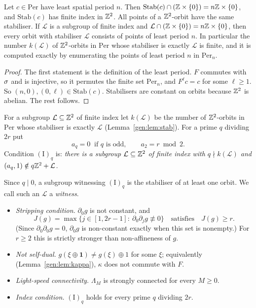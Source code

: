 \begin{lemma}\label{gen:lem:stab}
Let $c\in\mathrm{Per}$ have least spatial period $n$. Then $\mathrm{Stab}(c)\cap(\mathbb{Z}\times\{0\})=n\mathbb{Z}\times\{0\}$, and $\mathrm{Stab}(c)$ has finite index in $\mathbb{Z}^2$. All points of a $\mathbb{Z}^2$-orbit have the same stabiliser. If $\mathcal L$ is a subgroup of finite index and $\mathcal L\cap(\mathbb{Z}\times\{0\})=n\mathbb{Z}\times\{0\}$, then every orbit with stabiliser $\mathcal L$ consists of points of least period $n$. In particular the number $k(\mathcal L)$ of $\mathbb{Z}^2$-orbits in $\mathrm{Per}$ whose stabiliser is exactly $\mathcal L$ is finite, and it is computed exactly by enumerating the points of least period $n$ in $\mathrm{Per}_n$.
\end{lemma}

\begin{proof}
The first statement is the definition of the least period. $F$ commutes with $\sigma$ and is injective, so it permutes the finite set $\mathrm{Per}_n$, and $F^\ell c=c$ for some $\ell\ge1$. So $(n,0),(0,\ell)\in\mathrm{Stab}(c)$. Stabilisers are constant on orbits because $\mathbb{Z}^2$ is abelian. The rest follows.
\end{proof}

\begin{definition}\label{gen:def:index}
For a subgroup $\mathcal L\subseteq\mathbb{Z}^2$ of finite index let $k(\mathcal L)$ be the number of $\mathbb{Z}^2$-orbits in $\mathrm{Per}$ whose stabiliser is exactly $\mathcal L$ (Lemma~\ref{gen:lem:stab}). For a prime $q$ dividing $2r$ put
\[
a_q=0\ \text{ if $q$ is odd},\qquad a_2=r\bmod2 .
\]
Condition $(\mathrm{I})_q$ is: \emph{there is a subgroup $\mathcal L\subseteq\mathbb{Z}^2$ of finite index with $q\nmid k(\mathcal L)$ and $(a_q,1)\notin q\mathbb{Z}^2+\mathcal L$.}
\end{definition}

Since $q\mid0$, a subgroup witnessing $(\mathrm{I})_q$ is the stabiliser of at least one orbit. We call such an $\mathcal L$ a \emph{witness}.

\begin{definition}[hypotheses]\label{gen:def:hyp}
\begin{itemize}
\item[(N)] \emph{Stripping condition.} $\partial_0g$ is not constant, and
\[
J(g)=\max\{j\in[1,2r-1]:\ \partial_0\partial_jg\not\equiv0\}\quad\text{satisfies}\quad J(g)\ge r.
\]
(Since $\partial_0\partial_0g=0$, $\partial_0g$ is non-constant exactly when this set is nonempty.) For $r\ge2$ this is strictly stronger than non-affineness of $g$.
\item[(D)] \emph{Not self-dual.} $g(\xi\oplus\mathbf 1)\ne g(\xi)\oplus1$ for some $\xi$; equivalently (Lemma~\ref{gen:lem:kappa}), $\kappa$ does not commute with $F$.
\item[($\Lambda$)] \emph{Light-speed connectivity.} $\Lambda_M$ is strongly connected for every $M\ge0$.
\item[(I)] \emph{Index condition.} $(\mathrm{I})_q$ holds for every prime $q$ dividing $2r$.
\end{itemize}
\end{definition}

